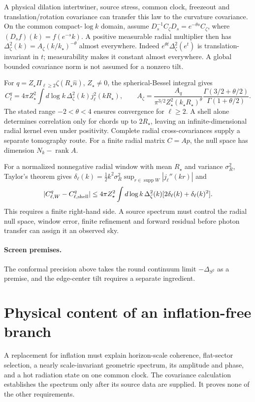 \documentclass[11pt]{article}
\theoremstyle{remark}
\theoremstyle{plain}
\begin{document}
A physical dilation intertwiner, source stress, common clock, freezeout and
translation/rotation covariance can transfer this law to the curvature
covariance. On the common compact-\(\log k\) domain, assume
\(D_s^{-1}C_\zeta D_s=e^{-\theta s}C_\zeta\), where
\((D_sf)(k)=f(e^{-s}k)\). A positive measurable radial multiplier then
has \(\Delta_\zeta^2(k)=A_\zeta(k/k_\star)^{-\theta}\) almost everywhere.
Indeed \(e^{\theta t}\Delta_\zeta^2(e^t)\) is translation-invariant in
\(t\); measurability makes it constant almost everywhere. A global bounded
covariance norm is not assumed for a nonzero tilt.

For \(q=Z_\star\Pi_{\ell\ge2}\zeta(R_\star\hat n)\),
\(Z_\star\ne0\), the spherical-Bessel integral gives
\[
 C_\ell^q=4\pi Z_\star^2\int d\log k\,
 \Delta_\zeta^2(k)j_\ell^2(kR_\star),\qquad
 A_\zeta=\frac{A_q}{\pi^{3/2}Z_\star^2(k_\star R_\star)^\theta}
 \frac{\Gamma(3/2+\theta/2)}{\Gamma(1+\theta/2)}.
\]
The stated range \(-2<\theta<4\) ensures convergence for \(\ell\ge2\).
A shell alone determines correlation only for chords up to \(2R_\star\),
leaving an infinite-dimensional radial kernel even under positivity.
Complete radial cross-covariances supply a separate tomography route.
For a finite radial matrix \(C=Ap\), the null space has dimension
\(N_k-\operatorname{rank}A\).

For a normalized nonnegative radial window with mean \(R_\star\) and
variance \(\sigma_R^2\), Taylor's theorem gives
\(\delta_\ell(k)=\tfrac12 k^2\sigma_R^2
\sup_{r\in\operatorname{supp}W}|j_\ell''(kr)|\) and
\[
 |C_{\ell,W}^q-C_{\ell,\rm shell}^q|
 \le4\pi Z_\star^2\int d\log k\,\Delta_\zeta^2(k)
 [2\delta_\ell(k)+\delta_\ell(k)^2].
\]
This requires a finite right-hand side. A source spectrum must control the
radial null space, window error, finite refinement and forward residual
before photon transfer can assign it an observed sky.

\paragraph{Screen premises.}
The conformal precision above takes the round continuum limit
\(-\Delta_{S^2}\) as a premise, and the edge-center tilt requires a separate
ingredient.

\section{Physical content of an inflation-free branch}
A replacement for inflation must explain horizon-scale coherence, flat-sector
selection, a nearly scale-invariant geometric spectrum, its amplitude and
phase, and a hot radiation state on one common clock. The covariance
calculation establishes the spectrum only after its source data are supplied.
It proves none of the other requirements.
\end{document}
